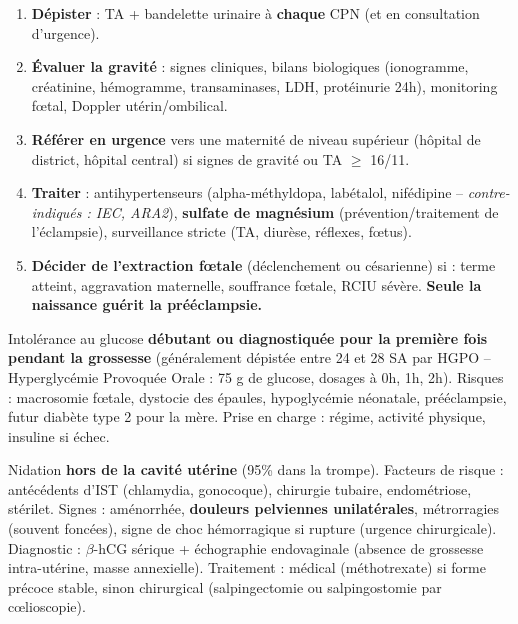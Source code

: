 \documentclass[11pt]{article}
\begin{document}
\begin{methode}
\begin{enumerate}
\item \textbf{Dépister} : TA + bandelette urinaire à \textbf{chaque} CPN (et en consultation d'urgence).
\item \textbf{Évaluer la gravité} : signes cliniques, bilans biologiques (ionogramme, créatinine, hémogramme, transaminases, LDH, protéinurie 24h), monitoring fœtal, Doppler utérin/ombilical.
\item \textbf{Référer en urgence} vers une maternité de niveau supérieur (hôpital de district, hôpital central) si signes de gravité ou TA $\geq$ 16/11.
\item \textbf{Traiter} : antihypertenseurs (alpha-méthyldopa, labétalol, nifédipine -- \emph{contre-indiqués : IEC, ARA2}), \textbf{sulfate de magnésium} (prévention/traitement de l'éclampsie), surveillance stricte (TA, diurèse, réflexes, fœtus).
\item \textbf{Décider de l'extraction fœtale} (déclenchement ou césarienne) si : terme atteint, aggravation maternelle, souffrance fœtale, RCIU sévère. \textbf{Seule la naissance guérit la prééclampsie.}
\end{enumerate}
\end{methode}

\begin{definition}
Intolérance au glucose \textbf{débutant ou diagnostiquée pour la première fois pendant la grossesse} (généralement dépistée entre 24 et 28 SA par HGPO -- Hyperglycémie Provoquée Orale : 75 g de glucose, dosages à 0h, 1h, 2h). Risques : macrosomie fœtale, dystocie des épaules, hypoglycémie néonatale, prééclampsie, futur diabète type 2 pour la mère. Prise en charge : régime, activité physique, insuline si échec.
\end{definition}

\begin{definition}
Nidation \textbf{hors de la cavité utérine} (95\% dans la trompe). Facteurs de risque : antécédents d'IST (chlamydia, gonocoque), chirurgie tubaire, endométriose, stérilet. Signes : aménorrhée, \textbf{douleurs pelviennes unilatérales}, métrorragies (souvent foncées), signe de choc hémorragique si rupture (urgence chirurgicale). Diagnostic : $\beta$-hCG sérique + échographie endovaginale (absence de grossesse intra-utérine, masse annexielle). Traitement : médical (méthotrexate) si forme précoce stable, sinon chirurgical (salpingectomie ou salpingostomie par cœlioscopie).
\end{definition}
\end{document}
